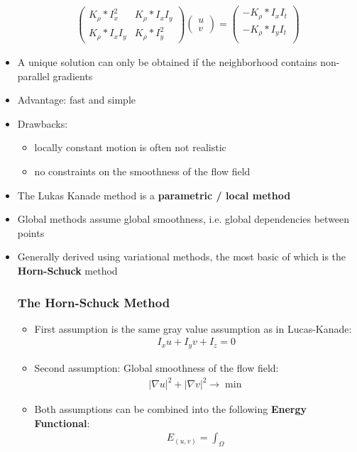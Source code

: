 \documentclass{scrartcl}
\begin{document}
\begin{itemize}
    \begin{align*}
        \begin{pmatrix}
            K_\rho * I_x^2 & K_\rho * I_x I_y\\
            K_\rho * I_x I_y & K_\rho * I_y ^2
        \end{pmatrix}
        \begin{pmatrix}
            u \\ v
        \end{pmatrix}
        = 
        \begin{pmatrix}
            - K_\rho * I_x I_t\\
            - K_\rho * I_y I_t\\
        \end{pmatrix}
    \end{align*}
    \item A unique solution can only be obtained if the neighborhood contains non-parallel gradients
    \item Advantage: fast and simple
    \item Drawbacks:
    \begin{itemize}
        \item locally constant motion is often not realistic
        \item no constraints on the smoothness of the flow field
    \end{itemize}
    \item The Lukas Kanade method is a \textbf{parametric / local method}
    \item Global methods assume global smoothness, i.e. global dependencies between points
    \item Generally derived using variational methods, the most basic of which is the \textbf{Horn-Schuck} method
    \subsubsection*{The Horn-Schuck Method}
    \begin{itemize}
        \item First assumption is the same gray value assumption as in Lucas-Kanade:
        \begin{align*}
            I_x u + I_y v + I_z = 0
        \end{align*}
        \item Second assumption: Global smoothness of the flow field:
        \begin{align*}
            |\nabla u|^2 + |\nabla v|^2 \to \min
        \end{align*}
        \item Both assumptions can be combined into the following \textbf{Energy Functional}:
        \begin{align*}
            E_(u,v) = \int_\Omega 
        \end{align*}
    \end{itemize}
\end{itemize}
\end{document}

